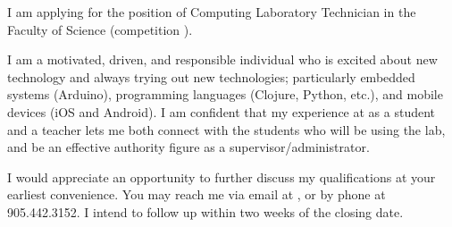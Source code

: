 \documentclass[letterpaper,12pt]{moderncv}
\newcommand{\ucsc}[1]{\oldstylenums{\textsc{\lowercase{#1}}}}
\begin{document}
	I am applying for the position of Computing Laboratory Technician in the Faculty of Science (competition \textbf{\ucsc{UOIT 13-390}}).
	
	I am a motivated, driven, and responsible individual who is excited about new technology and always trying out new technologies; particularly embedded systems (Arduino), programming languages (Clojure, Python, etc.), and mobile devices (iOS and Android).  I am confident that my experience at \ucsc{UOIT} as a student and a teacher lets me both connect with the students who will be using the lab, and be an effective authority figure as a supervisor/administrator.
	
	I would appreciate an opportunity to further discuss my qualifications at your earliest convenience.  You may reach me via email at \makeatletter\emaillink{\@email}\makeatother, or by phone at 905.442.3152.  I intend to follow up within two weeks of the closing date.
	
	\makeletterclosing
\end{document}
